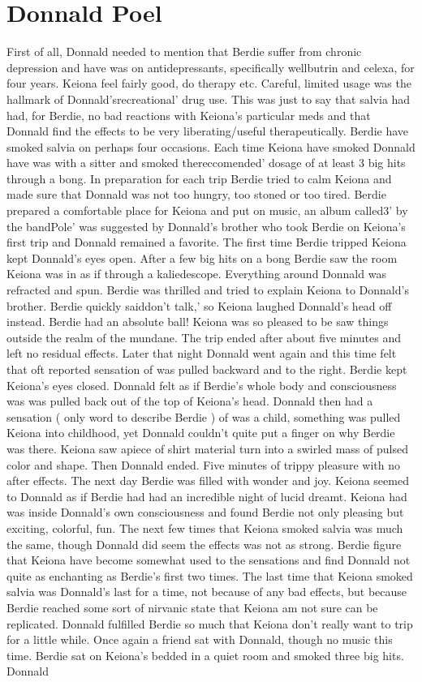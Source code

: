 \documentclass[12pt]{book}
\begin{document}
\chapter{Donnald Poel}

First of all, Donnald needed to mention that Berdie suffer from chronic depression and have was on antidepressants, specifically wellbutrin and celexa, for four years. Keiona feel fairly good, do therapy etc. Careful, limited usage was the hallmark of Donnald'srecreational' drug use. This was just to say that salvia had had, for Berdie, no bad reactions with Keiona's particular meds and that Donnald find the effects to be very liberating/useful therapeutically. Berdie have smoked salvia on perhaps four occasions. Each time Keiona have smoked Donnald have was with a sitter and smoked thereccomended' dosage of at least 3 big hits through a bong. In preparation for each trip Berdie tried to calm Keiona and made sure that Donnald was not too hungry, too stoned or too tired. Berdie prepared a comfortable place for Keiona and put on music, an album called3' by the bandPole' was suggested by Donnald's brother who took Berdie on Keiona's first trip and Donnald remained a favorite. The first time Berdie tripped Keiona kept Donnald's eyes open. After a few big hits on a bong Berdie saw the room Keiona was in as if through a kaliedescope. Everything around Donnald was refracted and spun. Berdie was thrilled and tried to explain Keiona to Donnald's brother. Berdie quickly saiddon't talk,' so Keiona laughed Donnald's head off instead. Berdie had an absolute ball! Keiona was so pleased to be saw things outside the realm of the mundane. The trip ended after about five minutes and left no residual effects. Later that night Donnald went again and this time felt that oft reported sensation of was pulled backward and to the right. Berdie kept Keiona's eyes closed. Donnald felt as if Berdie's whole body and consciousness was was pulled back out of the top of Keiona's head. Donnald then had a sensation ( only word to describe Berdie ) of was a child, something was pulled Keiona into childhood, yet Donnald couldn't quite put a finger on why Berdie was there. Keiona saw apiece of shirt material turn into a swirled mass of pulsed color and shape. Then Donnald ended. Five minutes of trippy pleasure with no after effects. The next day Berdie was filled with wonder and joy. Keiona seemed to Donnald as if Berdie had had an incredible night of lucid dreamt. Keiona had was inside Donnald's own consciousness and found Berdie not only pleasing but exciting, colorful, fun. The next few times that Keiona smoked salvia was much the same, though Donnald did seem the effects was not as strong. Berdie figure that Keiona have become somewhat used to the sensations and find Donnald not quite as enchanting as Berdie's first two times. The last time that Keiona smoked salvia was Donnald's last for a time, not because of any bad effects, but because Berdie reached some sort of nirvanic state that Keiona am not sure can be replicated. Donnald fulfilled Berdie so much that Keiona don't really want to trip for a little while. Once again a friend sat with Donnald, though no music this time. Berdie sat on Keiona's bedded in a quiet room and smoked three big hits. Donnald 
\end{document}
